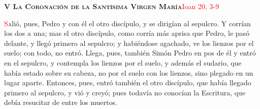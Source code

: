 \noindent\textbf{\textsc{V La Coronación de la Santísima Virgen María}}\hfill\textcolor{red}{Ioan 20, 3-9}

\vspace{0.25em}

\lettrine[lines=2]{\textcolor{red}{S}}alió, pues, Pedro y con él el otro discípulo, y se dirigían al sepulcro. Y corrían los dos a una; mas el otro
discípulo, como corría más aprisa que Pedro, le pasó delante, y llegó primero al sepulcro; y habiéndose agachado, ve los lienzos por el suelo; con
todo, no entró. Llega, pues, también Simón Pedro en pos de él y entró en el sepulcro, y contempla los lienzos por el suelo, y además el sudario, que 
había estado sobre su cabeza, no por el suelo con los lienzos, sino plegado en un lugar aparte. Entonces, pues, entró también el otro discípulo,
que había llegado primero al sepulcro, y vió y creyó; pues todavía no conocían la Escritura, que debía resucitar de entre los muertos.